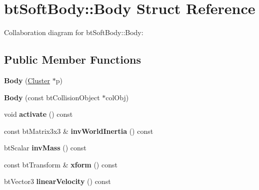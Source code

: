 \hypertarget{structbt_soft_body_1_1_body}{\section{bt\+Soft\+Body\+:\+:Body Struct Reference}
\label{structbt_soft_body_1_1_body}
}


Collaboration diagram for bt\+Soft\+Body\+:\+:Body\+:
\subsection*{Public Member Functions}
\begin{DoxyCompactItemize}
\item 
\hypertarget{structbt_soft_body_1_1_body_a0b287c295eaf49e1df203af5cfec21e4}{{\bfseries Body} (\hyperlink{structbt_soft_body_1_1_cluster}{Cluster} $\ast$p)}\label{structbt_soft_body_1_1_body_a0b287c295eaf49e1df203af5cfec21e4}

\item 
\hypertarget{structbt_soft_body_1_1_body_a7446fb5002adb460ab6a7f7bc2054a33}{{\bfseries Body} (const bt\+Collision\+Object $\ast$col\+Obj)}\label{structbt_soft_body_1_1_body_a7446fb5002adb460ab6a7f7bc2054a33}

\item 
\hypertarget{structbt_soft_body_1_1_body_a37e88a5e938ad87fb2683e8bb504697e}{void {\bfseries activate} () const }\label{structbt_soft_body_1_1_body_a37e88a5e938ad87fb2683e8bb504697e}

\item 
\hypertarget{structbt_soft_body_1_1_body_ab51af25119523d59be3fa41295da2c34}{const bt\+Matrix3x3 \& {\bfseries inv\+World\+Inertia} () const }\label{structbt_soft_body_1_1_body_ab51af25119523d59be3fa41295da2c34}

\item 
\hypertarget{structbt_soft_body_1_1_body_a7e4f3ec6167504b53971751a87286343}{bt\+Scalar {\bfseries inv\+Mass} () const }\label{structbt_soft_body_1_1_body_a7e4f3ec6167504b53971751a87286343}

\item 
\hypertarget{structbt_soft_body_1_1_body_a0bea3d7c3c8e70f0f424565622df3493}{const bt\+Transform \& {\bfseries xform} () const }\label{structbt_soft_body_1_1_body_a0bea3d7c3c8e70f0f424565622df3493}

\item 
\hypertarget{structbt_soft_body_1_1_body_af6a636c42817926cae19fb0976473216}{bt\+Vector3 {\bfseries linear\+Velocity} () const }\label{structbt_soft_body_1_1_body_af6a636c42817926cae19fb0976473216}


\end{DoxyCompactItemize}

